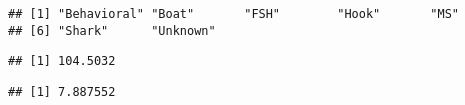 \documentclass[
]{article}
\newenvironment{Shaded}{\begin{snugshade}}{\end{snugshade}}
\newcommand{\AttributeTok}[1]{\textcolor[rgb]{0.13,0.29,0.53}{#1}}
\newcommand{\CommentTok}[1]{\textcolor[rgb]{0.56,0.35,0.01}{\textit{#1}}}
\newcommand{\ConstantTok}[1]{\textcolor[rgb]{0.56,0.35,0.01}{#1}}
\newcommand{\FunctionTok}[1]{\textcolor[rgb]{0.13,0.29,0.53}{\textbf{#1}}}
\newcommand{\NormalTok}[1]{#1}
\newcommand{\OtherTok}[1]{\textcolor[rgb]{0.56,0.35,0.01}{#1}}
\newcommand{\SpecialCharTok}[1]{\textcolor[rgb]{0.81,0.36,0.00}{\textbf{#1}}}
\begin{document}
\begin{verbatim}
## [1] "Behavioral" "Boat"       "FSH"        "Hook"       "MS"        
## [6] "Shark"      "Unknown"
\end{verbatim}

\begin{Shaded}
\end{Shaded}

\begin{verbatim}
## [1] 104.5032
\end{verbatim}

\begin{Shaded}
\end{Shaded}

\begin{verbatim}
## [1] 7.887552
\end{verbatim}
\end{document}
